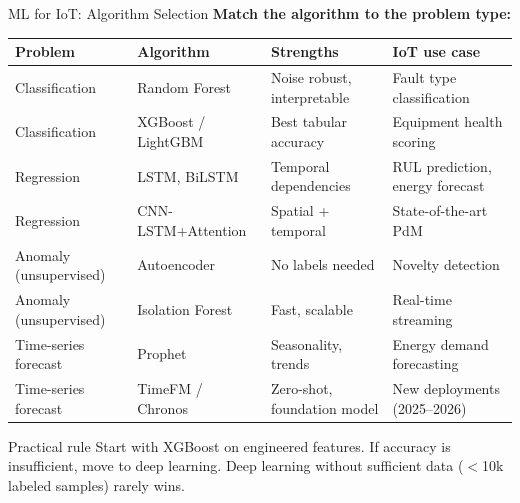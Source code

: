 \documentclass[aspectratio=169,11pt]{beamer}
\begin{document}
\begin{frame}{ML for IoT: Algorithm Selection}
    \small
    \textbf{Match the algorithm to the problem type:}

    \vspace{0.03cm}
    \begin{center}
    \tiny
    \begin{tabular}{p{2.3cm}p{2.8cm}p{3cm}p{3cm}}
        \toprule
        \textbf{Problem} & \textbf{Algorithm} & \textbf{Strengths} & \textbf{IoT use case} \\
        \midrule
        Classification & Random Forest & Noise robust, interpretable & Fault type classification \\
        Classification & XGBoost / LightGBM & Best tabular accuracy & Equipment health scoring \\
        Regression & LSTM, BiLSTM & Temporal dependencies & RUL prediction, energy forecast \\
        Regression & CNN-LSTM+Attention & Spatial + temporal & State-of-the-art PdM \\
        Anomaly (unsupervised) & Autoencoder & No labels needed & Novelty detection \\
        Anomaly (unsupervised) & Isolation Forest & Fast, scalable & Real-time streaming \\
        Time-series forecast & Prophet & Seasonality, trends & Energy demand forecasting \\
        Time-series forecast & TimeFM / Chronos & Zero-shot, foundation model & New deployments (2025--2026) \\
        \bottomrule
    \end{tabular}
    \end{center}

    \begin{alertblock}{Practical rule}
        Start with XGBoost on engineered features. If accuracy is insufficient, move to deep learning. Deep learning without sufficient data ($<$10k labeled samples) rarely wins.
    \end{alertblock}
\end{frame}
\end{document}
